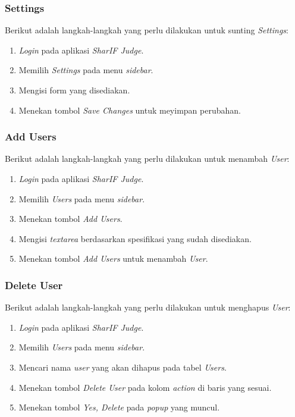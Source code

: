 \subsubsection{Settings}
\label{subsubsec:skenario_settings}
Berikut adalah langkah-langkah yang perlu dilakukan untuk sunting \textit{Settings}:

\begin{enumerate}
	\item \textit{Login} pada aplikasi \textit{SharIF Judge}.
	\item Memilih \textit{Settings} pada menu \textit{sidebar}.
	\item Mengisi form yang disediakan.
	\item Menekan tombol \textit{Save Changes} untuk meyimpan perubahan.
\end{enumerate}

\subsubsection{Add Users}
\label{subsubsec:skenario_add_users}
Berikut adalah langkah-langkah yang perlu dilakukan untuk menambah \textit{User}:

\begin{enumerate}
	\item \textit{Login} pada aplikasi \textit{SharIF Judge}.
	\item Memilih \textit{Users} pada menu \textit{sidebar}.
	\item Menekan tombol \textit{Add Users}.
	\item Mengisi \textit{textarea} berdasarkan spesifikasi yang sudah disediakan.
	\item Menekan tombol \textit{Add Users} untuk menambah \textit{User}.
\end{enumerate}

\subsubsection{Delete User}
\label{subsubsec:skenario_delete_user}
Berikut adalah langkah-langkah yang perlu dilakukan untuk menghapus \textit{User}:

\begin{enumerate}
	\item \textit{Login} pada aplikasi \textit{SharIF Judge}.
	\item Memilih \textit{Users} pada menu \textit{sidebar}.
	\item Mencari nama \textit{user} yang akan dihapus pada tabel \textit{Users}.
	\item Menekan tombol \textit{Delete User} pada kolom \textit{action} di baris yang sesuai.
	\item Menekan tombol \textit{Yes, Delete} pada \textit{popup} yang muncul.
\end{enumerate}

